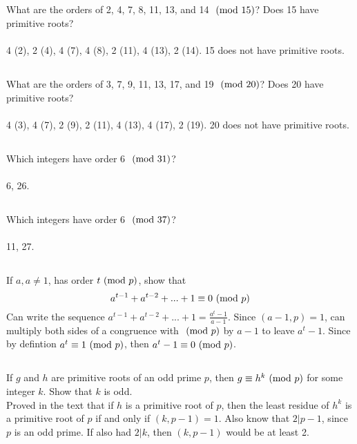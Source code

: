 \documentclass{article} \usepackage{amsmath}
\begin{document}
\subsection{}
What are the orders of 2, 4, 7, 8, 11, 13, and 14 $\ (\mathrm{mod}\ 15)$?
Does 15 have primitive roots?\\~\\
4 (2), 2 (4), 4 (7), 4 (8), 2 (11), 4 (13), 2 (14).
15 does not have primitive roots.

\subsection{}
What are the orders of 3, 7, 9, 11, 13, 17, and 19 $\ (\mathrm{mod}\ 20)$?
Does 20 have primitive roots?\\~\\
4 (3), 4 (7), 2 (9), 2 (11), 4 (13), 4 (17), 2 (19).
20 does not have primitive roots.

\subsection{}
Which integers have order 6 $\ (\mathrm{mod}\ 31)$?\\~\\
6, 26.

\subsection{}
Which integers have order 6 $\ (\mathrm{mod}\ 37)$?\\~\\
11, 27.

\subsection{}
If $a, a \neq 1$, has order $t \ (\mathrm{mod}\ p)$, show that
\begin{equation*}
    a^{t-1} + a^{t-2} + ... + 1 \equiv 0 \ (\mathrm{mod}\ p)
\end{equation*}
Can write the sequence $a^{t-1} + a^{t-2} + ... + 1 = \frac{a^t - 1}{a - 1}$.
Since $(a - 1, p) = 1$, can multiply both sides of a congruence with
$\ (\mathrm{mod}\ p)$ by $a - 1$ to leave $a^t - 1$.
Since by defintion $a^t \equiv 1 \ (\mathrm{mod}\ p)$, then $a^t - 1 \equiv 0 \ (\mathrm{mod}\ p)$.

\subsection{}
If $g$ and $h$ are primitive roots of an odd prime $p$, then $g \equiv h^k \ (\mathrm{mod}\ p)$
for some integer $k$. Show that $k$ is odd.\\
Proved in the text that if $h$ is a primitive root of $p$, then the least residue
of $h^k$ is a primitive root of $p$ if and only if $(k, p - 1) = 1$.
Also know that $2|p - 1$, since $p$ is an odd prime.
If also had $2|k$, then $(k, p - 1)$ would be at least 2.
\end{document}
